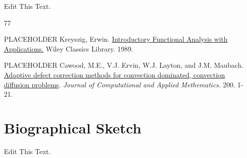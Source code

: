 \documentclass[12pt]{article}
\begin{document}
Edit This Text.
\begin{thebibliography}{77}   %
\small

 PLACEHOLDER Kreyszig, Erwin.  \underline{Introductory Functional Analysis with Applications.}  Wiley Classics Library.  1989.

 PLACEHOLDER Cawood, M.E., V.J. Ervin, W.J. Layton, and J.M. Maubach.  \underline{Adaptive defect correction methods for convection dominated, convection diffusion problems}.  \textit{Journal of Computational and Applied Methematics}.  200.  1-21.

\end{thebibliography}      %

\newpage
\section*{Biographical Sketch}

Edit This Text.
\end{document}
